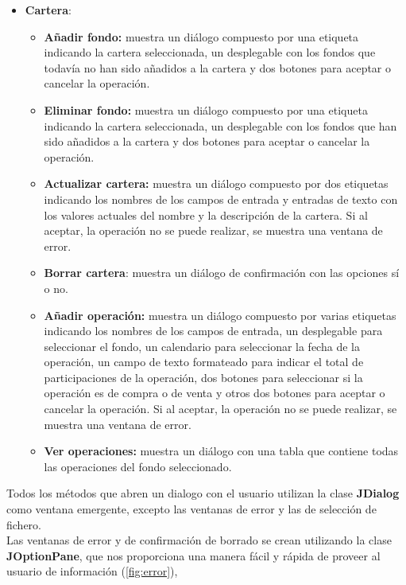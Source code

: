 \documentclass[12pt, a4paper]{book}
\begin{document}
\begin{itemize}
	\item \textbf{Cartera}:
	\begin{itemize}
		\item\textbf{Añadir fondo:} muestra un diálogo compuesto por una etiqueta indicando la cartera seleccionada, un desplegable con los fondos que todavía no han sido añadidos a la cartera y dos botones para aceptar o cancelar la operación.
		\item \textbf{Eliminar fondo:} muestra un diálogo compuesto por una etiqueta indicando la cartera seleccionada, un desplegable con los fondos que han sido añadidos a la cartera y dos botones para aceptar o cancelar la operación.
		\item \textbf{Actualizar cartera:} muestra un diálogo compuesto por dos etiquetas indicando los nombres de  los campos de entrada y entradas de texto con los valores actuales del nombre y la descripción de la cartera. Si al aceptar, la operación no se puede realizar, se muestra una ventana de error.
		\item \textbf{Borrar cartera}: muestra un diálogo de confirmación con las opciones sí o no.
		\item \textbf{Añadir operación:} muestra un diálogo compuesto por varias etiquetas indicando los nombres de  los campos de entrada, un desplegable para seleccionar el fondo, un calendario para seleccionar la fecha de la operación, un campo de texto formateado para indicar el total de participaciones de la operación, dos botones para seleccionar si la operación es de compra o de venta y otros dos botones para aceptar o cancelar la operación. Si al aceptar, la operación no se puede realizar, se muestra una ventana de error.
		\item \textbf{Ver operaciones:} muestra un diálogo con una tabla que contiene todas las operaciones del fondo seleccionado.\\
	\end{itemize}
\end{itemize}

Todos los métodos que abren un dialogo con el usuario utilizan la clase \textbf{JDialog} como ventana emergente, excepto las ventanas de error y las de selección de fichero.\\

Las ventanas de error y de confirmación de borrado se crean utilizando la clase \textbf{JOptionPane}, que nos proporciona una manera fácil y rápida de proveer al usuario de información (\ref{fig:error}),
\end{document}

